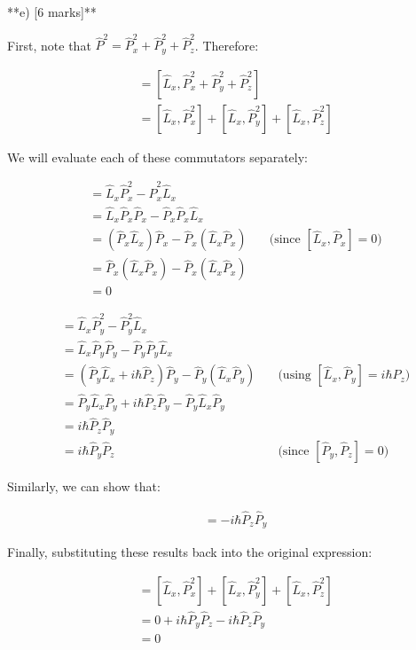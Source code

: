 \documentclass{article}
\begin{document}
**e)  [6 marks]**

First, note that $\hat{P}^2 = \hat{P}_x^2 + \hat{P}_y^2 + \hat{P}_z^2$.  Therefore:

\begin{align*}
[\hat{L}_x, \hat{P}^2] &= [\hat{L}_x, \hat{P}_x^2 + \hat{P}_y^2 + \hat{P}_z^2] \\
&= [\hat{L}_x, \hat{P}_x^2] + [\hat{L}_x, \hat{P}_y^2] + [\hat{L}_x, \hat{P}_z^2]
\end{align*}

We will evaluate each of these commutators separately:

\begin{align*}
[\hat{L}_x, \hat{P}_x^2] &= \hat{L}_x \hat{P}_x^2 - \hat{P}_x^2 \hat{L}_x \\
&= \hat{L}_x \hat{P}_x \hat{P}_x - \hat{P}_x \hat{P}_x \hat{L}_x \\
&= (\hat{P}_x \hat{L}_x)\hat{P}_x - \hat{P}_x (\hat{L}_x \hat{P}_x)  \quad & \text{(since } [\hat{L}_x, \hat{P}_x] = 0) \\
&= \hat{P}_x (\hat{L}_x \hat{P}_x) - \hat{P}_x (\hat{L}_x \hat{P}_x) \\
&= 0
\end{align*}

\begin{align*}
[\hat{L}_x, \hat{P}_y^2] &= \hat{L}_x \hat{P}_y^2 - \hat{P}_y^2 \hat{L}_x \\
&= \hat{L}_x \hat{P}_y \hat{P}_y - \hat{P}_y \hat{P}_y \hat{L}_x \\
&= (\hat{P}_y \hat{L}_x + i\hbar \hat{P}_z)\hat{P}_y - \hat{P}_y (\hat{L}_x \hat{P}_y) \quad & \text{(using } [\hat{L}_x, \hat{P}_y] = i\hbar \hat{P}_z) \\
&= \hat{P}_y \hat{L}_x \hat{P}_y + i\hbar \hat{P}_z \hat{P}_y - \hat{P}_y \hat{L}_x \hat{P}_y \\
&= i\hbar \hat{P}_z \hat{P}_y \\
&= i\hbar \hat{P}_y \hat{P}_z  \quad & \text{(since } [\hat{P}_y, \hat{P}_z] = 0) 
\end{align*}

Similarly, we can show that:

\begin{align*}
[\hat{L}_x, \hat{P}_z^2] &= -i\hbar \hat{P}_z \hat{P}_y
\end{align*}

Finally, substituting these results back into the original expression:

\begin{align*}
[\hat{L}_x, \hat{P}^2] &= [\hat{L}_x, \hat{P}_x^2] + [\hat{L}_x, \hat{P}_y^2] + [\hat{L}_x, \hat{P}_z^2] \\
&= 0 + i\hbar \hat{P}_y \hat{P}_z - i\hbar \hat{P}_z \hat{P}_y \\
&= 0
\end{align*} 
\end{document}
